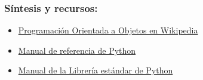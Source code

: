 \documentclass{beamer}
\begin{document}
\begin{frame}
\frametitle{Síntesis y recursos:}

\begin{itemize}
\item \href{https://en.wikipedia.org/wiki/Object-oriented_programming}{Programación Orientada a Objetos en Wikipedia}
\item \href{https://docs.python.org/3/reference/index.html}{Manual de referencia de Python}
\item \href{https://docs.python.org/3/library/index.html}{Manual de la Librería estándar de Python}
\end{itemize}
\end{frame}
\end{document}
